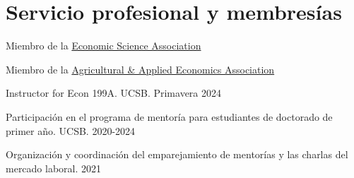 
\section{Servicio profesional y membresías}

{Miembro de la \href{https://www.economicscience.org/}{Economic Science Association}}
{}
{}
{}{}

{Miembro de la \href{https://www.aaea.org/}{Agricultural \& Applied Economics Association}}
{}
{}
{}{}



{Instructor for Econ 199A.}
{UCSB.}
{Primavera 2024}{}{}

{Participación en el programa de mentoría para estudiantes de doctorado de primer año.}
{UCSB.}
{}{}{2020-2024}

{Organización y coordinación del emparejamiento de mentorías y las charlas del mercado laboral.}
{}{}{2021}





